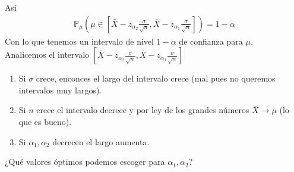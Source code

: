 \documentclass[10pt]{article}
\theoremstyle{plain}
\theoremstyle{definition}
\begin{document}
Así
\begin{align*}
\mathbb{P}_{\mu}\left(\mu \in [\bar{X}-z_{\alpha_{2}}\frac{\sigma}{\sqrt{n}}, \bar{X}-z_{\alpha_{1}}\frac{\sigma}{\sqrt{n}}]\right) = 1 - \alpha
\end{align*}
Con lo que tenemos un intervalo de nivel $1-\alpha$ de confianza para $\mu$.\\

Analicemos el intervalo $[\bar{X}-z_{\alpha_{2}}\frac{\sigma}{\sqrt{n}}, \bar{X}-z_{\alpha_{1}}\frac{\sigma}{\sqrt{n}}]$
\begin{enumerate}
\item Si $\sigma$ crece, enconces el largo del intervalo crece (mal pues no queremos intervalos muy largos).
\item Si $n$ crece el intervalo decrece y por ley de los grandes números $\bar{X}\rightarrow \mu$ (lo que es bueno).
\item Si $\alpha_{1}, \alpha_{2}$ decrecen el largo aumenta.
\end{enumerate}
¿Qué valores óptimos podemos escoger para $\alpha_{1}, \alpha_{2}$?\\
\end{document}
